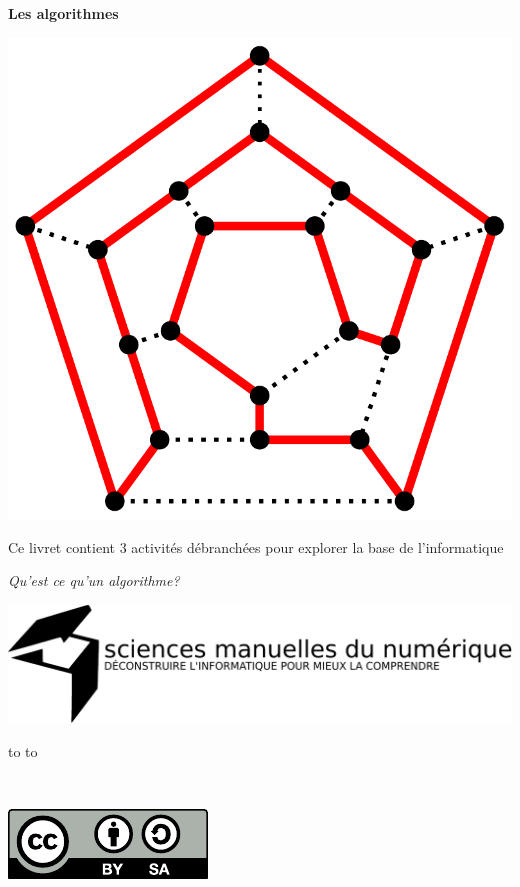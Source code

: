 \documentclass[a7paper,pagesize,DIV=14,10pt]{scrbook}
\begin{document}
\begin{center}
  \textbf{\huge Les algorithmes}
  
  \includegraphics[width=.5\linewidth]{img/Hamiltonian_path.pdf}
\end{center}

\vspace{-.5\baselineskip} %
Ce livret contient 3 activités débranchées pour explorer la base de
l'informatique

\medskip
\centerline{\large\textit{Qu'est ce qu'un algorithme?}}

\bigskip
\centerline{  \includegraphics[width=.9\linewidth]{img/logo_SMN.pdf}}


\begin{minipage}{.8\linewidth}
  \begin{spacing}{.5}
    \hbox to \linewidth{\tiny~\hfill Vous pouvez copier, modifier et diffuser librement ce document,}
    \hbox to \linewidth{\tiny~\hfill à condition de laisser ces mêmes droits à vos lecteurs.}
  \end{spacing}
\end{minipage}%
~
\begin{minipage}[b]{.16\linewidth}
  \includegraphics[width=\linewidth]{img/logo_by-sa.pdf}
\end{minipage}%
\end{document}
